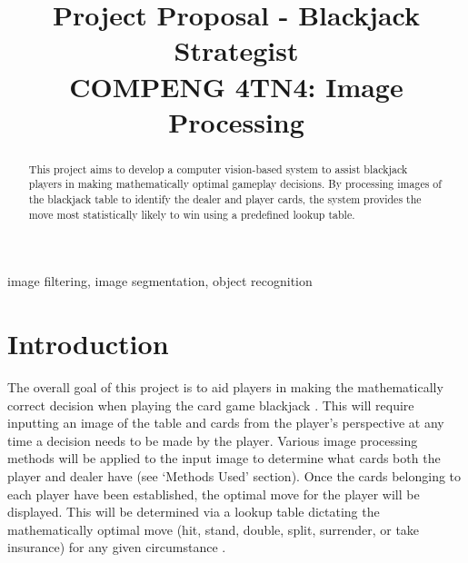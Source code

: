 \documentclass[conference]{IEEEtran}
\begin{document}
\title{Project Proposal - Blackjack Strategist\\
{\footnotesize COMPENG 4TN4: Image Processing}
}

\author{
\and
{}
\and
{}
}

\maketitle

\begin{abstract}
    This project aims to develop a computer vision-based system to assist blackjack
     players in making mathematically optimal gameplay decisions. By processing images
     of the blackjack table to identify the dealer and player cards, the system
      provides the move most statistically likely to win using a predefined lookup
      table.
\end{abstract}

\begin{IEEEkeywords}
image filtering, image segmentation, object recognition
\end{IEEEkeywords}

\section{Introduction}
The overall goal of this project is to aid players in making the mathematically correct
decision when playing the card game blackjack \cite{baldwin_optimum_1956}. This will require inputting an
image of the table and cards from the player’s perspective at any time a decision needs to
be made by the player. Various image processing methods will be applied to the input image
to determine what cards both the player and dealer have (see ‘Methods Used’ section). Once
the cards belonging to each player have been established, the optimal move for the player
will be displayed. This will be determined via a lookup table dictating the mathematically
optimal move (hit, stand, double, split, surrender, or take insurance) for any given
circumstance \cite{cai_house_2022}.
\end{document}
